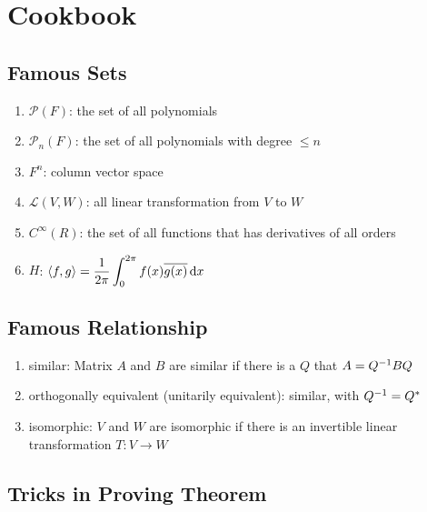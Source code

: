 \section{Cookbook}

\subsection{Famous Sets}

\begin{enumerate}
    \item $\mathcal{P}(F)$: the set of all polynomials
    \item $\mathcal{P}_n (F)$: the set of all polynomials with degree $\leq n$
    \item $F^n$: column vector space
    \item $\mathcal{L}(V,W)$: all linear transformation from $V$ to $W$
    \item $C^\infty (R)$: the set of all functions that has derivatives of all orders
    \item $H$: $\displaystyle \innerproduct{f}{g} = \frac{1}{2 \pi} \int_{0}^{2\pi} f(x) \conjugate{g(x)} \dif x$
\end{enumerate}

\subsection{Famous Relationship}
\begin{enumerate}
    \item similar: Matrix $A$ and $B$ are similar if there is a $Q$ that $A = {Q}^{-1} B Q$
    \item orthogonally equivalent (unitarily equivalent): similar, with ${Q}^{-1} = Q^*$
    \item isomorphic: $V$ and $W$ are isomorphic if there is an invertible linear transformation $T:V \rightarrow W$
\end{enumerate}


\subsection{Tricks in Proving Theorem}

